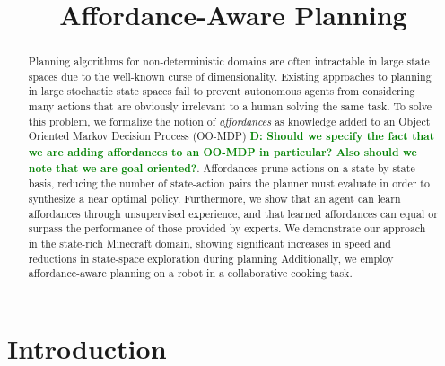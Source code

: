 \documentclass[conference]{IEEEtran}
\newcommand{\dnote}[1]{\textcolor{Green}{\textbf{D: #1}}}
\begin{document}
\title{Affordance-Aware Planning}

\author{
}

\maketitle

\begin{abstract}
Planning algorithms for non-deterministic domains are often
intractable in large state spaces due to the well-known curse of
dimensionality. Existing approaches to planning in large stochastic state spaces fail to
prevent autonomous agents from considering many actions that are
obviously irrelevant to a human solving the same task. To solve this problem,
we formalize the notion of {\em affordances} as knowledge added to an 
Object Oriented Markov Decision Process (OO-MDP) \dnote{Should we specify the fact that
we are adding affordances to an OO-MDP in particular? Also should we note that we are goal oriented?}.
Affordances prune actions on a state-by-state basis, reducing the number of 
state-action pairs the planner must evaluate in order to synthesize a near optimal policy.
Furthermore, we show that an agent can learn affordances through unsupervised 
experience, and that learned affordances can equal or surpass the performance of those
provided by experts. We demonstrate our approach in the state-rich Minecraft domain, 
showing significant increases in speed and reductions in state-space exploration during
planning %
Additionally, we employ affordance-aware planning on a robot in a collaborative cooking task. 

\end{abstract}

\IEEEpeerreviewmaketitle

\section{Introduction}
\label{sec:introduction}
\end{document}
